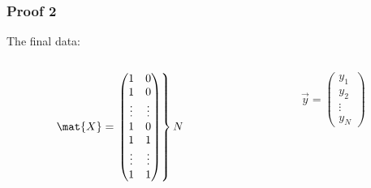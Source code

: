 \documentclass[mathserif, xcolor=table, svgnames]{beamer}
\begin{document}
\begin{frame}
  \frametitle{Proof 2}
  The final data:
  \bigskip
  \begin{columns}
    \begin{column}{0.49\linewidth}
      \begin{equation*}
        \mat{X} = \left.
          \begin{pmatrix}
            1 & 0 \\ 1 & 0 \\ \vdots & \vdots \\ 1 & 0\\
            1 & 1 \\ \vdots & \vdots \\ 1 & 1\\
          \end{pmatrix}
        \right\}
        N
      \end{equation*}
    \end{column}  
    \begin{column}{0.49\linewidth}
      \begin{equation*}
        \vec{y} =
          \begin{pmatrix}
            y_{1} \\ y_{2} \\ \vdots \\ y_{N}
          \end{pmatrix}
      \end{equation*}
    \end{column}  
  \end{columns}
\end{frame}
\end{document}
